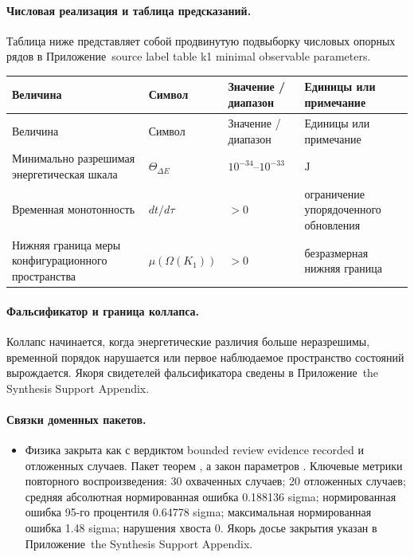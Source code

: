 \paragraph{Числовая реализация и таблица предсказаний.}
Таблица ниже представляет собой продвинутую подвыборку числовых опорных рядов в Приложение~source label table k1 minimal observable parameters.
\begin{longtable}{@{}L{0.27\textwidth}L{0.15\textwidth}L{0.24\textwidth}L{0.16\textwidth}@{}}
\toprule
Величина & Символ & Значение / диапазон & Единицы или примечание \\
\midrule
\endfirsthead
\toprule
Величина & Символ & Значение / диапазон & Единицы или примечание \\
\midrule
\endhead
Минимально разрешимая энергетическая шкала & $\scriptstyle \Theta_{\Delta E}$ & $10^{-34}\text{--}10^{-33}$ & $\mathrm{J}$ \\
Временная монотонность & $\scriptstyle dt/\allowbreak d\tau$ & $> 0$ & ограничение упорядоченного обновления \\
Нижняя граница меры конфигурационного пространства & $\scriptstyle \mu(\Omega(K_1))$ & $> 0$ & безразмерная нижняя граница \\
\bottomrule
\end{longtable}

\paragraph{Фальсификатор и граница коллапса.}
Коллапс начинается, когда энергетические различия больше неразрешимы, временной порядок нарушается или первое наблюдаемое пространство состояний вырождается.
Якоря свидетелей фальсификатора сведены в Приложение~the Synthesis Support Appendix.

\paragraph{Связки доменных пакетов.}
\begin{itemize}[leftmargin=1.6em,nosep]
\item Физика закрыта как  с вердиктом bounded review evidence recorded и  отложенных случаев. Пакет теорем , а закон параметров . Ключевые метрики повторного воспроизведения: 30 охваченных случаев; 20 отложенных случаев; средняя абсолютная нормированная ошибка 0.188136 sigma; нормированная ошибка 95-го процентиля 0.64778 sigma; максимальная нормированная ошибка 1.48 sigma; нарушения хвоста 0. Якорь досье закрытия указан в Приложение~the Synthesis Support Appendix.
\end{itemize}

